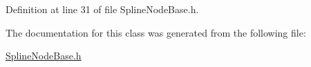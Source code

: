 Definition at line 31 of file Spline\+Node\+Base.\+h.



The documentation for this class was generated from the following file\+:\begin{DoxyCompactItemize}
\item 
\hyperlink{_spline_node_base_8h}{Spline\+Node\+Base.\+h}\end{DoxyCompactItemize}
